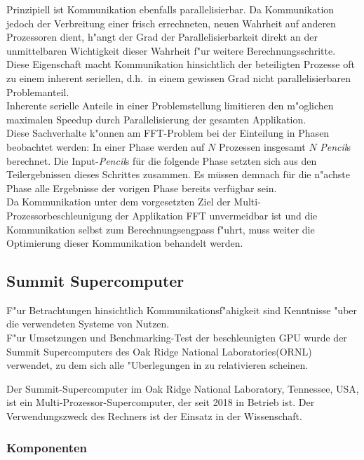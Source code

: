 Prinzipiell ist Kommunikation ebenfalls parallelisierbar. Da Kommunikation jedoch der Verbreitung einer frisch errechneten, neuen Wahrheit auf anderen Prozessoren dient, h"angt der Grad der Parallelisierbarkeit direkt an der unmittelbaren Wichtigkeit dieser Wahrheit f"ur weitere Berechnungsschritte.\\
Diese Eigenschaft macht Kommunikation hinsichtlich der beteiligten Prozesse oft zu einem inherent seriellen, d.h.~in einem gewissen Grad nicht parallelisierbaren Problemanteil.\\
Inherente serielle Anteile in einer Problemstellung limitieren den m"oglichen maximalen Speedup durch Parallelisierung der gesamten Applikation.\\
Diese Sachverhalte k"onnen am FFT-Problem bei der Einteilung in Phasen beobachtet werden: In einer Phase werden auf $N$ Prozessen insgesamt $N$ \textit{Pencil}s berechnet. Die Input-\textit{Pencil}s für die folgende Phase setzten sich aus den Teilergebnissen dieses Schrittes zusammen. Es müssen demnach für die n"achste Phase alle Ergebnisse der vorigen Phase bereits verfügbar sein.\\
Da Kommunikation unter dem vorgesetzten Ziel der Multi-Prozessorbeschleunigung der Applikation FFT unvermeidbar ist und die Kommunikation selbst zum Berechnungsengpass f"uhrt, muss weiter die Optimierung dieser Kommunikation behandelt werden.


\subsection{Summit Supercomputer}
F"ur Betrachtungen hinsichtlich Kommunikationsf"ahigkeit sind Kenntnisse "uber die verwendeten Systeme von Nutzen.\\
F"ur Umsetzungen und Benchmarking-Test der beschleunigten GPU wurde der Summit Supercomputers des Oak Ridge National Laboratories(ORNL) verwendet, zu dem sich alle "Uberlegungen in \cite{mainpaper} zu relativieren scheinen.

Der Summit-Supercomputer im Oak Ridge National Laboratory, Tennessee, USA, ist ein Multi-Prozessor-Supercomputer, der seit 2018 in Betrieb ist. Der Verwendungszweck des Rechners ist der Einsatz in der Wissenschaft.

\subsubsection{Komponenten}

